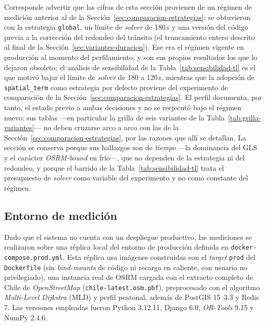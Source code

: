 Corresponde advertir que las cifras de esta sección provienen de un
régimen de medición anterior al de la
Sección~\ref{sec:comparacion-estrategias}: se obtuvieron con la estrategia
\texttt{global}, un límite de \textit{solver} de 180\,s y una versión del código previa a
la corrección del redondeo del tránsito (el truncamiento entero descrito al
final de la Sección~\ref{sec:variantes-duracion}). Ese era el régimen vigente en
producción al momento del perfilamiento, y son sus propios resultados los que lo
dejaron obsoleto: el análisis de sensibilidad de la
Tabla~\ref{tab:sensibilidad-tl} es el que motivó bajar el límite de \textit{solver} de
180 a 120\,s, mientras que la adopción de \texttt{spatial\_term} como estrategia
por defecto proviene del experimento de comparación de la
Sección~\ref{sec:comparacion-estrategias}. El perfil documenta, por tanto, el
estado previo a ambas decisiones y no se reejecutó bajo el régimen nuevo: sus
tablas ---en particular la grilla de seis variantes de la
Tabla~\ref{tab:grilla-variantes}--- no deben cruzarse arco a arco con
las de la Sección~\ref{sec:comparacion-estrategias}, por las razones que allí se
detallan. La sección se conserva porque sus hallazgos son de \textit{tiempo}
---la dominancia del GLS y el carácter \textit{OSRM-bound} en frío---, que no
dependen de la estrategia ni del redondeo, y porque el barrido de la
Tabla~\ref{tab:sensibilidad-tl} trata el presupuesto de \textit{solver} como variable del
experimento y no como constante del régimen.

\subsection{Entorno de medición}

Dado que el sistema no cuenta con un despliegue productivo, las mediciones se
realizaron sobre una réplica local del entorno de producción definida en
\texttt{docker-compose.prod.yml}. Esta réplica usa imágenes construidas con el \textit{target}
\texttt{prod} del \texttt{Dockerfile} (sin \textit{bind-mounts} de código ni
recarga en caliente, con usuario no privilegiado), una instancia real de OSRM
cargada con el extracto completo de Chile de \textit{OpenStreetMap}
(\texttt{chile-latest.osm.pbf}), preprocesado con el algoritmo
\textit{Multi-Level Dijkstra} (MLD) \citep{delling2017customizable} y perfil
peatonal, además de PostGIS \citep{postgis} 15--3.3 y Redis 7. Las versiones
empleadas fueron Python 3.12.11, Django \citep{django} 6.0, \textit{OR-Tools}
\citep{ortools} 9.15 y NumPy 2.4.6.

